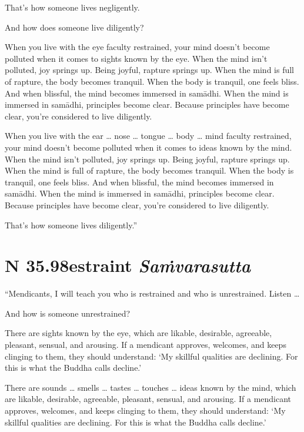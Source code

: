 \documentclass[12pt,openany]{book}%
\newcommand*{\suttatitleacronym}[1]{\smaller[2]{#1}\vspace*{.3em}}
\newcommand*{\suttatitletranslation}[1]{\linebreak{#1}}
\newcommand*{\suttatitleroot}[1]{\linebreak\smaller[2]\itshape{#1}}
\newcommand*{\tocacronym}[1]{\hspace*{-3.3em}{#1}\quad}
\newcommand*{\toctranslation}[1]{#1}
\newcommand*{\tocroot}[1]{(\textit{#1})}
\begin{document}
That’s how someone lives negligently. 

And how does someone live diligently? 

When you live with the eye faculty restrained, your mind doesn’t become polluted when it comes to sights known by the eye. When the mind isn’t polluted, joy springs up. Being joyful, rapture springs up. When the mind is full of rapture, the body becomes tranquil. When the body is tranquil, one feels bliss. And when blissful, the mind becomes immersed in \textsanskrit{samādhi}. When the mind is immersed in \textsanskrit{samādhi}, principles become clear. Because principles have become clear, you’re considered to live diligently. 

When you live with the ear … nose … tongue … body … mind faculty restrained, your mind doesn’t become polluted when it comes to ideas known by the mind. When the mind isn’t polluted, joy springs up. Being joyful, rapture springs up. When the mind is full of rapture, the body becomes tranquil. When the body is tranquil, one feels bliss. And when blissful, the mind becomes immersed in \textsanskrit{samādhi}. When the mind is immersed in \textsanskrit{samādhi}, principles become clear. Because principles have become clear, you’re considered to live diligently. 

That’s how someone lives diligently.” 

%
\section*{{\suttatitleacronym SN 35.98}{\suttatitletranslation Restraint }{\suttatitleroot Saṁvarasutta}}
\addcontentsline{toc}{section}{\tocacronym{SN 35.98} \toctranslation{Restraint } \tocroot{Saṁvarasutta}}

“Mendicants, I will teach you who is restrained and who is unrestrained. Listen … 

And how is someone unrestrained? 

There are sights known by the eye, which are likable, desirable, agreeable, pleasant, sensual, and arousing. If a mendicant approves, welcomes, and keeps clinging to them, they should understand: ‘My skillful qualities are declining. For this is what the Buddha calls decline.’ 

There are sounds … smells … tastes … touches … ideas known by the mind, which are likable, desirable, agreeable, pleasant, sensual, and arousing. If a mendicant approves, welcomes, and keeps clinging to them, they should understand: ‘My skillful qualities are declining. For this is what the Buddha calls decline.’ 
\end{document}
